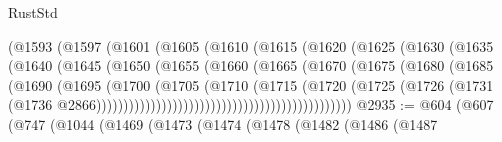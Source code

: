 \begin{lexlean}{RustStd}
\begin{coremodule}
                                    (@1593
                                      (@1597
                                        (@1601
                                          (@1605
                                            (@1610
                                              (@1615
                                                (@1620
                                                  (@1625
                                                    (@1630
                                                      (@1635
                                                        (@1640
                                                          (@1645
                                                            (@1650
                                                              (@1655
                                                                (@1660
                                                                  (@1665
                                                                    (@1670
                                                                      (@1675
                                                                        (@1680
                                                                          (@1685
                                                                            (@1690
                                                                              (@1695
                                                                                (@1700
                                                                                  (@1705
                                                                                    (@1710
                                                                                      (@1715
                                                                                        (@1720
                                                                                          (@1725
                                                                                            (@1726
                                                                                              (@1731
                                                                                                (@1736
                                                                                                  @2866)))))))))))))))))))))))))))))))))))))))))))))))
@2935 := @604
    (@607
      (@747
        (@1044
          (@1469
            (@1473
              (@1474
                (@1478
                  (@1482
                    (@1486
                      (@1487

\end{coremodule}
\end{lexlean}
